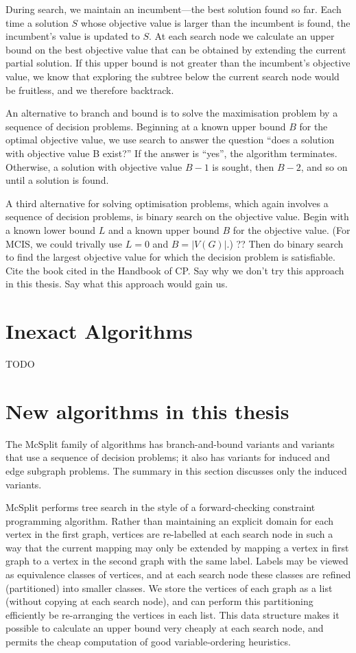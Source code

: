 During search, we maintain an incumbent---the best solution found so far. Each
time a solution $S$ whose objective value is larger than the incumbent is found,
the incumbent’s value is updated to $S$. At each search node we calculate an
upper bound on the best objective value that can be obtained by extending the
current partial solution. If this upper bound is not greater than the
incumbent’s objective value, we know that exploring the subtree below the
current search node would be fruitless, and we therefore backtrack.

An alternative to branch and bound is to solve the maximisation problem by a
sequence of decision problems. Beginning at a known upper bound $B$ for the
optimal objective value, we use search to answer the question “does a solution
with objective value B exist?” If the answer is “yes”, the algorithm
terminates. Otherwise, a solution with objective value $B-1$ is sought, then $B-2$,
and so on until a solution is found.

A third alternative for solving optimisation problems, which again involves a
sequence of decision problems, is binary search on the objective value. Begin
with a known lower bound $L$ and a known upper bound $B$ for the objective value.
(For MCIS, we could trivally use $L=0$ and $B=|V(G)|$.) ?? Then do binary search to
find the largest objective value for which the decision problem is satisfiable.
Cite the book cited in the Handbook of CP. Say why we don’t try this approach
in this thesis.  Say what this approach would gain us.

\section{Inexact Algorithms}

TODO

\section{New algorithms in this thesis}

The McSplit family of algorithms has branch-and-bound variants and variants
that use a sequence of decision problems; it also has variants for induced and
edge subgraph problems. The summary in this section discusses only the induced
variants.

McSplit performs tree search in the style of a forward-checking constraint
programming algorithm. Rather than maintaining an explicit domain for each
vertex in the first graph, vertices are re-labelled at each search node in such
a way that the current mapping may only be extended by mapping a vertex in
first graph to a vertex in the second graph with the same label. Labels may be
viewed as equivalence classes of vertices, and at each search node these
classes are refined (partitioned) into smaller classes. We store the vertices
of each graph as a list (without copying at each search node), and can perform
this partitioning efficiently be re-arranging the vertices in each list. This
data structure makes it possible to calculate an upper bound very cheaply at
each search node, and permits the cheap computation of good variable-ordering
heuristics.

